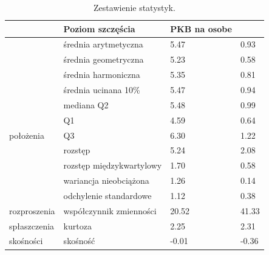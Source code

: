 \documentclass{article}
\theoremstyle{break}
\begin{document}
\begin{table}[H]
	\centering
	\begin{tabular}{|ll|l|l|}
		\hline
		\rowcolor[HTML]{C0C0C0} 
		\multicolumn{2}{|l|}{\cellcolor[HTML]{C0C0C0}Miary}                             & Poziom szczęścia & PKB na osobe \\ \hline
		\multicolumn{1}{|l|}{}                               & średnia arytmetyczna     & 5.47             & 0.93         \\ \cline{2-4} 
		\multicolumn{1}{|l|}{}                               & średnia geometryczna     & 5.23             & 0.58         \\ \cline{2-4} 
		\multicolumn{1}{|l|}{}                               & średnia harmoniczna      & 5.35             & 0.81         \\ \cline{2-4} 
		\multicolumn{1}{|l|}{}                               & średnia ucinana 10\%     & 5.47             & 0.94         \\ \cline{2-4} 
		\multicolumn{1}{|l|}{}                               & mediana Q2               & 5.48             & 0.99         \\ \cline{2-4} 
		\multicolumn{1}{|l|}{}                               & Q1                       & 4.59             & 0.64         \\ \cline{2-4} 
		\multicolumn{1}{|l|}{położenia}    & Q3                       & 6.30             & 1.22         \\ \hline
		\multicolumn{1}{|l|}{}                               & rozstęp                  & 5.24             & 2.08         \\ \cline{2-4} 
		\multicolumn{1}{|l|}{}                               & rozstęp międzykwartylowy & 1.70             & 0.58         \\ \cline{2-4} 
		\multicolumn{1}{|l|}{}                               & wariancja nieobciążona   & 1.26             & 0.14         \\ \cline{2-4} 
		\multicolumn{1}{|l|}{}                               & odchylenie standardowe   & 1.12             & 0.38         \\ \cline{2-4} 
		\multicolumn{1}{|l|}{rozproszenia} & współczynnik zmienności  & 20.52            & 41.33        \\ \hline
		\multicolumn{1}{|l|}{spłaszczenia}                   & kurtoza                  & 2.25             & 2.31         \\ \hline
		\multicolumn{1}{|l|}{skośności}                      & skośność                 & -0.01            & -0.36        \\ \hline
	\end{tabular}
\caption{\label{table}Zestawienie statystyk.}
\end{table}
	
\end{document}

